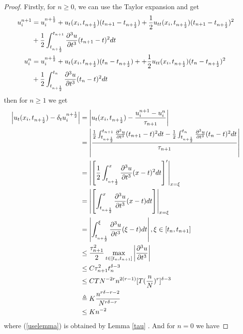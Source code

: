 \documentclass[10pt, reqno]{amsart}
\theoremstyle{remark}
\theoremstyle{definition}
\numberwithin{table}{section}
\begin{document}
\begin{proof}
    Firstly, for $n\geq 0$, we can use the Taylor expansion and get
    \begin{align}
        u_i^{n+1}&=u_i^{n+\frac{1}{2}}+u_t(x_i, t_{n+\frac{1}{2}})(t_{n+1}-t_{n+\frac{1}{2}})+\frac{1}{2}u_{tt}(x_i, t_{n+\frac{1}{2}})(t_{n+1}-t_{n+\frac{1}{2}})^2\notag\\
        &+\frac{1}{2}\int_{t_{n+\frac{1}{2}}}^{t_{n+1}}\frac{\partial^3 u}{\partial t^3}(t_{n+1}-t)^2dt \notag\\
        u_i^{n}&=u_i^{n+\frac{1}{2}}+u_t(x_i, t_{n+\frac{1}{2}})(t_{n}-t_{n+\frac{1}{2}})++\frac{1}{2}u_{tt}(x_i, t_{n+\frac{1}{2}})(t_{n}-t_{n+\frac{1}{2}})^2\notag\\
        &+\frac{1}{2}\int_{t_{n+\frac{1}{2}}}^{t_{n}}\frac{\partial^3 u}{\partial t^3}(t_{n}-t)^2dt \notag
    \end{align}
    then for $n\geq 1$ we get 
    \begin{align}
\left|u_t(x_i, t_{n+\frac{1}{2}})-\delta_tu_i^{n+\frac{1}{2}}\right| & =\left|u_t(x_i, t_{n+\frac{1}{2}})-\frac{u_i^{n+1}-u_i^n}{\tau_{n+1}}\right| \notag\\
& =\left|\frac{\frac{1}{2}\int_{t_{n+\frac{1}{2}}}^{t_{n+1}}\frac{\partial^3 u}{\partial t^3}(t_{n+1}-t)^2dt-\frac{1}{2}\int_{t_{n+\frac{1}{2}}}^{t_{n}}\frac{\partial^3 u}{\partial t^3}(t_{n}-t)^2dt}{\tau_{n+1}}\right| \notag\\
& =\left|\left[\frac{1}{2}\int_{t_{n+\frac{1}{2}}}^x \frac{\partial^3 u}{\partial t^3}(x-t)^2 d t\right]^{\prime}\right|_{x=\xi} \label{mean} \\
& =\left|\left[\int_{t_{n+\frac{1}{2}}}^x \frac{\partial^3 u}{\partial t^3}(x-t) d t\right]\right|_{x=\xi}  \notag\\
& =\left|\int_{t_{n+\frac{1}{2}}}^{\xi} \frac{\partial^3 u}{\partial t^3}(\xi - t) d t\right|,  \xi \in\left[t_n,  t_{n+1}\right] \notag\\
& \leq \frac{\tau_{n+1}^2}{2} \max _{t \in\left[t_n,  t_{n+1}\right]}\left|\frac{\partial^3 u}{\partial t^3}\right| \notag\\
& \leq C \tau_{n+1}^2 t_n^{\delta-3} \notag\\
&\leq CTN^{-2r}n^{2(r-1)}[T(\frac{n}{N})^r]^{\delta-3} \label{uselemma}\\
&\triangleq{}K\frac{n^{r\delta-r-2}}{N^{r\delta-r}}\notag\\
&\leq Kn^{-2}\notag
\end{align}
where (\ref{uselemma}) is obtained by Lemma \ref{tau} . And for $n=0$ we have

\end{proof}
\end{document}
